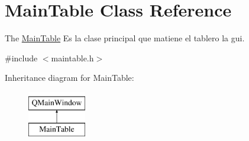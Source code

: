 \hypertarget{class_main_table}{\section{Main\-Table Class Reference}
\label{class_main_table}
}


The \hyperlink{class_main_table}{Main\-Table} Es la clase principal que matiene el tablero la gui.  




{\ttfamily \#include $<$maintable.\-h$>$}

Inheritance diagram for Main\-Table\-:\begin{figure}[H]
\begin{center}
\leavevmode
\includegraphics[height=2.000000cm]{class_main_table}
\end{center}
\end{figure}
